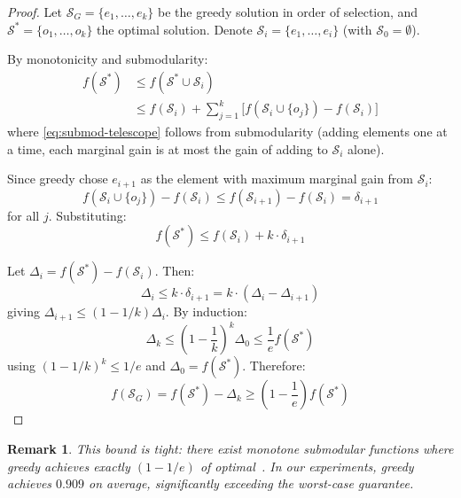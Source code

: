 \documentclass[11pt]{article}
\newtheorem{remark}[theorem]{Remark}
\begin{document}
\begin{proof}
Let $\mathcal{S}_G = \{e_1, \ldots, e_k\}$ be the greedy solution in order of
selection, and $\mathcal{S}^* = \{o_1, \ldots, o_k\}$ the optimal solution.
Denote $\mathcal{S}_i = \{e_1, \ldots, e_i\}$ (with $\mathcal{S}_0 = \emptyset$).

By monotonicity and submodularity:
\begin{align}
f(\mathcal{S}^*) &\leq f(\mathcal{S}^* \cup \mathcal{S}_i) \label{eq:mono} \\
&\leq f(\mathcal{S}_i) + \sum_{j=1}^k \big[ f(\mathcal{S}_i \cup \{o_j\}) - f(\mathcal{S}_i) \big] \label{eq:submod-telescope}
\end{align}
where \eqref{eq:submod-telescope} follows from submodularity (adding elements
one at a time, each marginal gain is at most the gain of adding to $\mathcal{S}_i$
alone).

Since greedy chose $e_{i+1}$ as the element with maximum marginal gain from
$\mathcal{S}_i$:
\begin{equation}
f(\mathcal{S}_i \cup \{o_j\}) - f(\mathcal{S}_i) \leq f(\mathcal{S}_{i+1}) - f(\mathcal{S}_i) = \delta_{i+1}
\end{equation}
for all $j$. Substituting:
\begin{equation}
f(\mathcal{S}^*) \leq f(\mathcal{S}_i) + k \cdot \delta_{i+1}
\end{equation}

Let $\Delta_i = f(\mathcal{S}^*) - f(\mathcal{S}_i)$. Then:
\begin{equation}
\Delta_i \leq k \cdot \delta_{i+1} = k \cdot (\Delta_i - \Delta_{i+1})
\end{equation}
giving $\Delta_{i+1} \leq (1 - 1/k) \Delta_i$. By induction:
\begin{equation}
\Delta_k \leq \left(1 - \frac{1}{k}\right)^k \Delta_0 \leq \frac{1}{e} f(\mathcal{S}^*)
\end{equation}
using $(1 - 1/k)^k \leq 1/e$ and $\Delta_0 = f(\mathcal{S}^*)$. Therefore:
\begin{equation}
f(\mathcal{S}_G) = f(\mathcal{S}^*) - \Delta_k \geq \left(1 - \frac{1}{e}\right) f(\mathcal{S}^*)
\end{equation}
\end{proof}

\begin{remark}
This bound is tight: there exist monotone submodular functions where
greedy achieves exactly $(1-1/e)$ of optimal~\citep{nemhauser1978analysis}.
In our experiments, greedy achieves $0.909$ on average, significantly
exceeding the worst-case guarantee.
\end{remark}
\end{document}
